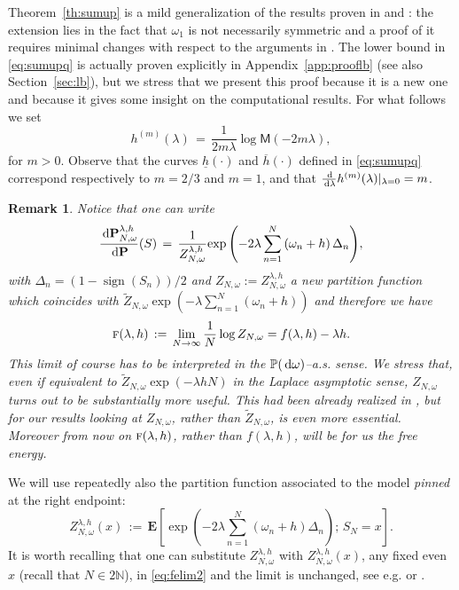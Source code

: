 \documentclass[reqno,11pt]{amsart}
\numberwithin{equation}{section}
\newtheorem{rem}[theorem]{Remark}
\DeclareMathOperator{\sign}{\mathrm{sign}}
\newcommand{\N}{\mathbb{N}}
\renewcommand{\tilde}{\widetilde}
\newcommand{\bP}{{\ensuremath{\mathbf P}} }
\newcommand{\bE}{{\ensuremath{\mathbf E}} }
\newcommand{\dd}{\,\text{\rm d}}             %
\newcommand{\bbP}{{\ensuremath{\mathbb P}} }
\newcommand{\go}{\omega}
\newcommand{\gl}{\lambda}
\newcommand{\tf}{\textsc{f}}
\newcommand{\M}{\textsf{M}}
\begin{document}
\medskip


Theorem~\ref{th:sumup} is a mild generalization of the
results proven
in \cite{cf:BdH} and \cite{cf:BG2}:
the extension lies in the fact that $\go_1$ is not necessarily symmetric
and a proof of it requires minimal changes with respect to the
arguments in  \cite{cf:BG2}.
The  lower bound in \eqref{eq:sumupq} is actually
proven explicitly in Appendix~\ref{app:prooflb} (see also Section~\ref{sec:lb}),
but we stress that we present
this proof because it is a new one and because it gives
some insight on the computational results.
For what follows we set
\begin{equation}
\label{eq:hm}
h^{(m)}(\gl) \, = \, \frac 1{2m\gl } \log \M\left( -2m\gl \right),
\end{equation}
for $m >0$. Observe that the curves $\underline h(\cdot)$ and $\overline h(\cdot)$ defined in \eqref{eq:sumupq} correspond respectively to $m=2/3$ and $m=1$, and that $\frac{\dd}{\dd\gl} h^{(m)}(\gl) |_{\gl=0} = m$.



\medskip

\begin{rem}
\label{rem:Z}
\rm
Notice that one can write
\begin{equation}
\label{eq:Boltzmann1}
\frac {\dd \bP_{N, \go}^{\gl, h}} {\dd \bP} (S)
\, = \,
\frac 1
{{Z}_{N,\go}^{\gl,h}}
{ \exp\left( -2 \gl \sum_{n=1}^N \left( \go_n +h\right) \Delta_n
\right)}
,
\end{equation}
with $\Delta_n = \left(1-\sign (S_n)\right)/2$ and $Z_{N,\go} := Z_{N,\go}^{\gl, h}$
a new partition function which coincides with $\tilde Z_{N, \go} \exp \left( - \gl \sum_{n=1}^N (\go_n +h) \right)$
and therefore
we have
\begin{equation}
\label{eq:felim2}
\tf (\gl, h) \, := \, \lim_{N \to \infty}
\frac 1N \log Z_{N, \go}= f(\gl, h)-\gl h.
\end{equation}
This limit of course has to be interpreted in the $\bbP (\dd \go)$--a.s. sense.
We stress that,
even if  equivalent to $\tilde Z_{N, \go}\exp(-\gl h N)$ in the Laplace asymptotic sense,
$Z_{N , \go}$ turns out to be substantially more useful. This had been
already realized in \cite{cf:BdH}, but
for our results    looking at $Z_{N, \go}$, rather
than  $\tilde Z_{N, \go}$, is even more essential. Moreover from now on
$\tf (\gl, h)$, rather than $f(\gl , h)$,  will be for us the free energy.
 \end{rem}

We will use repeatedly also the partition function associated to the
model {\sl pinned} at the right endpoint:
\begin{equation}
\label{eq:pinned}
Z_{N, \go}^{\gl, h}(x) \, :=\,
\bE\left[
 \exp\left(
 -2 \gl \sum_{n=1}^N \left( \go_n +h\right) \Delta_n
\right); \, S_N= x
\right].
\end{equation}
It is worth recalling that one can substitute $Z_{N, \go}^{\gl, h}$ with $Z_{N, \go}^{\gl, h}(x)$,
any fixed even $x$ (recall that $N \in 2\N$), in
\eqref{eq:felim2} and the limit is unchanged, see e.g. \cite{cf:BdH} or \cite{cf:G}.
\end{document}
